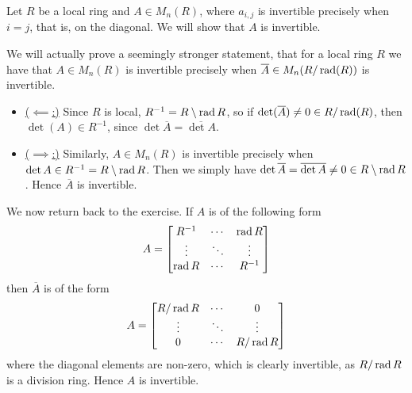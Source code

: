 \documentclass[a4paper, 12pt]{article}
\begin{document}
\begin{Exercise}
    Let $R$ be a local ring and $A \in M_n(R)$, where $a_{i,j}$ is invertible
    precisely when
    $i = j$, that is, on the diagonal.
    We will show that $A$ is invertible.

    We will actually prove a seemingly stronger statement, that for a local ring $R$ we have that
    $A \in M_n(R)$ is invertible precisely when $\overline{A} \in M_n(R/\operatorname{rad}(R))$ is invertible.
    \begin{itemize}
        \item \underline{($\impliedby$:)}
            Since $R$ is local, $R^{-1} = R\setminus \operatorname{rad} R$, so if $\det(\overline{A}) \neq 0 \in R/\operatorname{rad}(R)$,
            then $\det(A) \in R^{-1}$, since $\det\overline{A} = \overline{\det A}$.
        \item \underline{($\implies$:)}
            Similarly, $A \in M_n(R)$ is invertible precisely when $\det A \in R^{-1} = R \setminus \operatorname{rad} R$.
            Then we simply have $\det \overline{A} = \overline{\det A} \neq 0 \in R\setminus \operatorname{rad} R$.
            Hence $\overline{A}$ is invertible.
    \end{itemize}
    We now return back to the exercise.
    If $A$ is of the following form
    \[
        A =
        \begin{bmatrix}
            R^{-1} & \cdots & \operatorname{rad} R \\
            \vdots & \ddots & \vdots \\
            \operatorname{rad} R & \cdots & R^{-1} \\
        \end{bmatrix}
    \]
    then $\overline{A}$ is of the form
    \[
        A =
        \begin{bmatrix}
            R/\operatorname{rad} R & \cdots & 0 \\
            \vdots & \ddots & \vdots \\
            0 & \cdots & R/\operatorname{rad} R \\
        \end{bmatrix}
    \]
    where the diagonal elements are non-zero, which is clearly invertible, as $R/\operatorname{rad} R$ is a division ring.
    Hence $A$ is invertible.
\end{Exercise}
\end{document}
